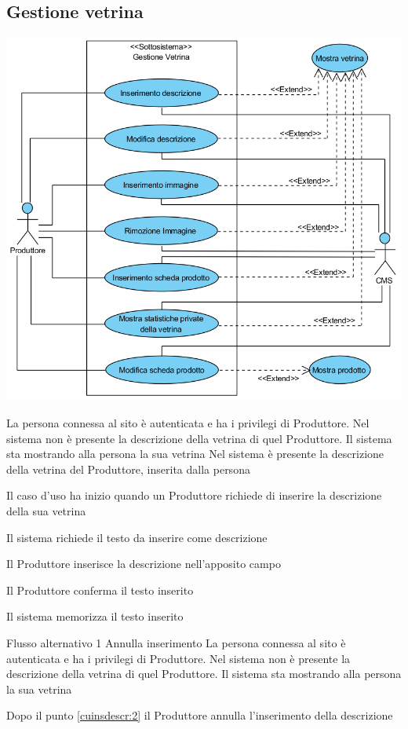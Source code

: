 \subsection{Gestione vetrina}
\begin{center}
   \includegraphics[width=\textwidth]{assets/visualParadigm/cu/GestioneVentrina}
\end{center}
{}
{La persona connessa al sito è autenticata e ha i privilegi di Produttore. Nel sistema non è presente la descrizione della vetrina di quel Produttore. Il sistema sta mostrando alla persona la sua vetrina}
{Nel sistema è presente la descrizione della vetrina del Produttore, inserita dalla persona}
{\begin{enumCU}
		\item Il caso d'uso ha inizio quando un Produttore richiede di inserire la descrizione della sua vetrina
		\item Il sistema richiede il testo da inserire come descrizione 
		\item Il Produttore inserisce la descrizione nell'apposito campo\label{cuinsdescr:2}
		\item Il Produttore conferma il testo inserito
		\item Il sistema memorizza il testo inserito
	\end{enumCU}}
%
{Flusso alternativo 1}%
{Annulla inserimento}%
{La persona connessa al sito è autenticata e ha i privilegi di Produttore. Nel sistema non è presente la descrizione della vetrina di quel Produttore. Il sistema sta mostrando alla persona la sua vetrina}%
{\postNulle}%
{\begin{enumCU}
		\item Dopo il punto \ref{cuinsdescr:2} il Produttore annulla l'inserimento della descrizione
	\end{enumCU}}%

